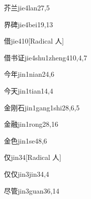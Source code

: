 \begin{verbete}{芥兰}{jie4lan2}{7,5}
\end{verbete}

\begin{verbete}{界碑}{jie4bei1}{9,13}
\end{verbete}

\begin{verbete}{借}{jie4}{10}[Radical 人]
\end{verbete}

\begin{verbete}{借书证}{jie4shu1zheng4}{10,4,7}
\end{verbete}

\begin{verbete}{今年}{jin1nian2}{4,6}
\end{verbete}

\begin{verbete}{今天}{jin1tian1}{4,4}
\end{verbete}

\begin{verbete}{金刚石}{jin1gang1shi2}{8,6,5}
\end{verbete}

\begin{verbete}{金融}{jin1rong2}{8,16}
\end{verbete}

\begin{verbete}{金色}{jin1se4}{8,6}
\end{verbete}

\begin{verbete}{仅}{jin3}{4}[Radical 人]
\end{verbete}

\begin{verbete}{仅仅}{jin3jin3}{4,4}
\end{verbete}

\begin{verbete}{尽管}{jin3guan3}{6,14}
\end{verbete}

